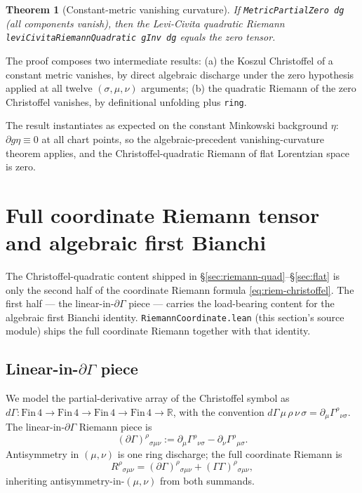\documentclass[twocolumn]{revtex4-2}
\newtheorem{theorem}{Theorem}
\newcommand{\Christoffel}{\Gamma}
\newcommand{\Mink}{\eta}
\newcommand{\Riem}{R}
\newcommand{\PartG}{\partial g}
\begin{document}
\begin{theorem}[Constant-metric vanishing curvature]\label{thm:flat}
If \texttt{MetricPartialZero dg} (all components vanish), then the
Levi-Civita quadratic Riemann
\texttt{leviCivitaRiemannQuadratic gInv dg} equals the zero tensor.
\end{theorem}

The proof composes two intermediate results: (a) the Koszul
Christoffel of a constant metric vanishes, by direct algebraic
discharge under the zero hypothesis applied at all twelve $(\sigma,\mu,\nu)$
arguments; (b) the quadratic Riemann of the zero Christoffel vanishes,
by definitional unfolding plus \texttt{ring}.

The result instantiates as expected on the constant Minkowski
background $\Mink$: $\PartG\Mink \equiv 0$ at all chart points, so
the algebraic-precedent vanishing-curvature theorem applies, and the
Christoffel-quadratic Riemann of flat Lorentzian space is zero.

\section{Full coordinate Riemann tensor and algebraic first Bianchi}
\label{sec:full-riemann}

The Christoffel-quadratic content shipped in
\S\ref{sec:riemann-quad}--\S\ref{sec:flat} is only the second half of
the coordinate Riemann formula \eqref{eq:riem-christoffel}. The first
half — the linear-in-$\partial\Christoffel$ piece — carries the
load-bearing content for the algebraic first Bianchi identity.
\texttt{RiemannCoordinate.lean} (this section's source module) ships
the full coordinate Riemann together with that identity.

\subsection{Linear-in-$\partial\Christoffel$ piece}
We model the partial-derivative array of the Christoffel symbol as
$d\Christoffel : \mathrm{Fin}\,4 \to \mathrm{Fin}\,4 \to \mathrm{Fin}\,4
\to \mathrm{Fin}\,4 \to \mathbb{R}$, with the convention
$d\Christoffel\,\mu\,\rho\,\nu\,\sigma = \partial_{\mu}
\Christoffel^{\rho}{}_{\nu\sigma}$. The linear-in-$\partial\Christoffel$
Riemann piece is
\begin{equation}
(\partial\Christoffel)^{\rho}{}_{\sigma\mu\nu}
  := \partial_{\mu}\Christoffel^{\rho}{}_{\nu\sigma}
   - \partial_{\nu}\Christoffel^{\rho}{}_{\mu\sigma}.
\label{eq:dGamma}
\end{equation}
Antisymmetry in $(\mu,\nu)$ is one ring discharge; the full coordinate
Riemann is
\begin{equation}
\Riem^{\rho}{}_{\sigma\mu\nu}
  = (\partial\Christoffel)^{\rho}{}_{\sigma\mu\nu}
  + (\Christoffel\Christoffel)^{\rho}{}_{\sigma\mu\nu},
\label{eq:full-riem}
\end{equation}
inheriting antisymmetry-in-$(\mu,\nu)$ from both summands.
\end{document}
